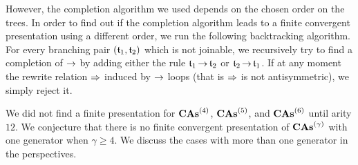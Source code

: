 However, the completion algorithm we used depends on the chosen order on
the trees. In order to find out if the completion algorithm leads to a
finite convergent presentation using a different order, we run the
following backtracking algorithm. For every branching pair
$(\mathfrak{t}_1, \mathfrak{t}_2)$ which is not joinable, we recursively try to find a
completion of $\operatorname{\to}$ by adding either the rule
$\mathfrak{t}_1 \operatorname{\to}  \mathfrak{t}_2$ or $\mathfrak{t}_2 \operatorname{\to}  \mathfrak{t}_1$.
If at any moment the rewrite relation $\operatorname{\Rightarrow}$ induced by $\operatorname{\to}$
loops (that is $\operatorname{\Rightarrow}$ is not antisymmetric), we simply reject it.
\medbreak

We did not find a finite presentation for $\mathbf{CAs}^{\left(4\right)}$, $\mathbf{CAs}^{\left(5\right)}$, and
$\mathbf{CAs}^{\left(6\right)}$ until arity $12$. We conjecture that there is no finite
convergent presentation of $\mathbf{CAs}^{\left(\gamma\right)}$ with one generator when
$\gamma \geq 4$. We discuss the cases with more than one generator in
the perspectives.
\medbreak

